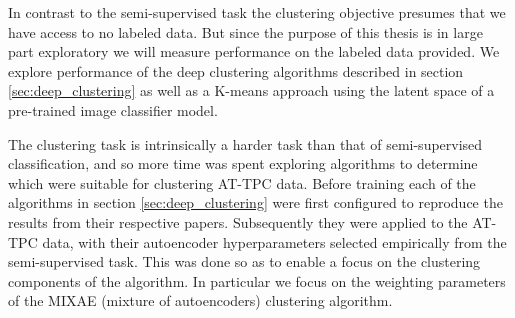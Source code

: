 In contrast to the semi-supervised task the clustering objective presumes that we have access to no labeled data. But since the purpose of this thesis is in large part exploratory we will measure performance on the labeled data provided. We explore performance of the deep clustering algorithms described in section \ref{sec:deep_clustering} as well as a K-means approach using the latent space of a pre-trained image classifier model. 

The clustering task is intrinsically a harder task than that of semi-supervised classification, and so more time was spent exploring algorithms to determine which were suitable for clustering AT-TPC data. Before training each of the algorithms in section \ref{sec:deep_clustering} were first configured to reproduce the results from their respective papers. Subsequently they were applied to the AT-TPC data, with their autoencoder hyperparameters selected empirically from the semi-supervised task. This was done so as to enable a focus on the clustering components of the algorithm. In particular we focus on the weighting parameters of the MIXAE (mixture of autoencoders) clustering algorithm.
